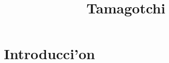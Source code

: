 \documentclass[12pt]{amsart}
\title{Tamagotchi}
\author{}
\date{}
\begin{document}
\maketitle
\tableofcontents

\section{Introducci'on}
\end{document}
